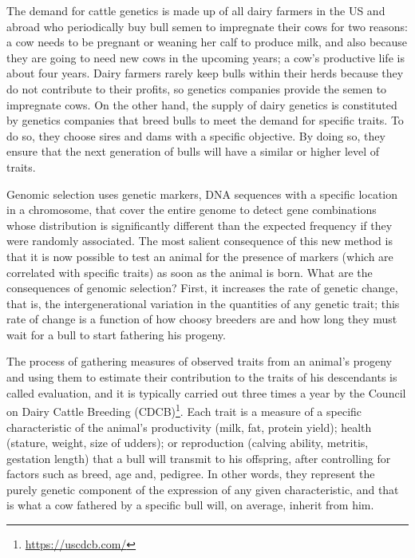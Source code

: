 \documentclass[12pt,letterpaper]{article}
\begin{document}
The demand for cattle genetics is made up of all dairy farmers in the US and abroad who periodically buy bull semen to impregnate their cows for two reasons: a cow needs to be pregnant or weaning her calf to produce milk, and also because they are going to need new cows in the upcoming years; a cow’s productive life is about four years. Dairy farmers rarely keep bulls within their herds because they do not contribute to their profits, so genetics companies provide the semen to impregnate cows. On the other hand, the supply of dairy genetics is constituted by genetics companies that breed bulls to meet the demand for specific traits. To do so, they choose sires and dams with a specific objective. By doing so, they ensure that the next generation of bulls will have a similar or higher level of traits.

Genomic selection uses genetic markers, DNA sequences with a specific location in a chromosome, that cover the entire genome to detect gene combinations whose distribution is significantly different than the expected frequency if they were randomly associated. The most salient consequence of this new method is that it is now possible to test an animal for the presence of markers (which are correlated with specific traits) as soon as the animal is born. What are the consequences of genomic selection? First, it increases the rate of genetic change, that is, the intergenerational variation in the quantities of any genetic trait; this rate of change is a function of how choosy breeders are and how long they must wait for a bull to start fathering his progeny.  

The process of gathering measures of observed traits from an animal’s progeny and using them to estimate their contribution to the traits of his descendants is called evaluation, and it is typically carried out three times a year by the Council on Dairy Cattle Breeding (CDCB)\footnote{\url{https://uscdcb.com/}}. Each trait is a measure of a specific characteristic of the animal’s productivity (milk, fat, protein yield); health (stature, weight, size of udders); or reproduction (calving ability, metritis, gestation length) that a bull will transmit to his offspring, after controlling for factors such as breed, age and, pedigree. In other words, they represent the purely genetic component of the expression of any given characteristic, and that is what a cow fathered by a specific bull will, on average, inherit from him.
\end{document}
